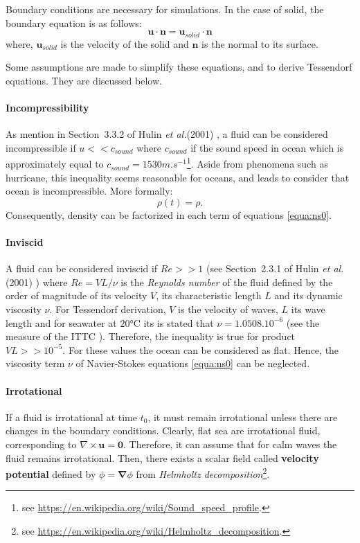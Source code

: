 \documentclass[final]{jcgt}
\def\etal{\emph{et al.}\xspace}
\begin{document}
Boundary conditions are necessary for simulations. In the case of solid, the boundary equation is as follows:
\begin{equation}
	\mathbf{u}\cdot\mathbf{n} = \mathbf{u}_{solid} \cdot \mathbf{n}
\end{equation}
where, $\mathbf{u}_{solid}$ is the velocity of the solid and $\mathbf{n}$ is the normal to its surface.

Some assumptions are made to simplify these equations, and to derive Tessendorf equations.
They are discussed below.

\paragraph{Incompressibility}
As mention in Section~3.3.2 of Hulin \etal (2001) \cite{hulinHydrodynamiquePhysique2001}, a fluid can be considered incompressible if $u<<c_{sound}$ where $c_{sound}$ if the sound speed in ocean which is approximately equal to $c_{sound} = 1530m.s^{-1}$\footnote{see \url{https://en.wikipedia.org/wiki/Sound_speed_profile}.}.
Aside from phenomena such as hurricane, this inequality seems reasonable for oceans, and leads to consider that ocean is incompressible.
More formally:
\begin{equation}
	\rho(t)=\rho.
\end{equation}
Consequently, density can be factorized in each term of equations \ref{equa:ns0}.

\paragraph{Inviscid}
A fluid can be considered inviscid if $Re>>1$ (see Section~2.3.1 of Hulin \etal (2001) \cite{hulinHydrodynamiquePhysique2001}) where $Re=VL/\nu$ is the \emph{Reynolds number} of the fluid defined by the order of magnitude of its velocity $V$, its characteristic length $L$ and its dynamic viscosity $\nu$.
For Tessendorf derivation, $V$ is the velocity of waves, $L$ its wave length and for seawater at $20$°C its is stated that $\nu=1.0508.10^{-6}$ (see the measure of the ITTC \cite{ittcFreshWaterSeawater2011}).
Therefore, the inequality is true for product $VL >> 10^{-5}$.
For these values the ocean can be considered as flat.
Hence, the viscosity term $\nu$ of Navier-Stokes equations \ref{equa:ns0} can be neglected.

\paragraph{Irrotational}
If a fluid is irrotational at time $t_0$, it must remain irrotational unless there are changes in the boundary conditions.
Clearly, flat sea are irrotational fluid, corresponding to $\nabla\times\mathbf{u} = \mathbf{0}$.
Therefore, it can assume that for calm waves the fluid remains irrotational.
Then, there exists a scalar field called \textbf{velocity potential} defined by $\phi = \mathbf{\nabla} \phi$ from \emph{Helmholtz decomposition}\footnote{see \url{https://en.wikipedia.org/wiki/Helmholtz_decomposition}.}.
\end{document}
